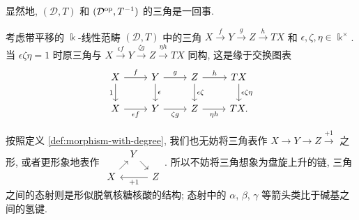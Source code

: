 显然地, $(\mathcal{D}, T)$ 和 $(\mathcal{D}^{\operatorname{op}}, T^{-1})$ 的三角是一回事.

\begin{remark}\label{rem:triangle-signs}
	考虑带平移的 $\Bbbk$-线性范畴 $(\mathcal{D}, T)$ 中的三角 $X \xrightarrow{f} Y \xrightarrow{g} Z \xrightarrow{h} TX$ 和 $\epsilon, \zeta, \eta \in \Bbbk^\times$. 当 $\epsilon\zeta\eta = 1$ 时原三角与 $X \xrightarrow{\epsilon f} Y \xrightarrow{\zeta g} Z \xrightarrow{\eta h} TX$ 同构, 这是缘于交换图表
	\[\begin{tikzcd}
		X \arrow[r, "f"] \arrow[d, "1"'] & Y \arrow[r, "g"] \arrow[d, "\epsilon"] & Z \arrow[r, "h"] \arrow[d, "\epsilon\zeta"] & TX \arrow[d, "\epsilon\zeta\eta"] \\
		X \arrow[r, "\epsilon f"'] & Y \arrow[r, "\zeta g"'] & Z \arrow[r, "\eta h"'] & TX .
	\end{tikzcd}\]
\end{remark}

按照定义 \ref{def:morphism-with-degree}, 我们也无妨将三角表作 $X \to Y \to Z \xrightarrow{+1}$ 之形, 或者更形象地表作
$\begin{tikzcd}[row sep=small, column sep=tiny]
	& Y \arrow[rd] & \\
	X \arrow[ru] & & Z \arrow[ll, "{+1}"]
\end{tikzcd}$.
所以不妨将三角想象为盘旋上升的链, 三角之间的态射则是形似脱氧核糖核酸的结构; 态射中的 $\alpha$, $\beta$, $\gamma$ 等箭头类比于碱基之间的氢键.

